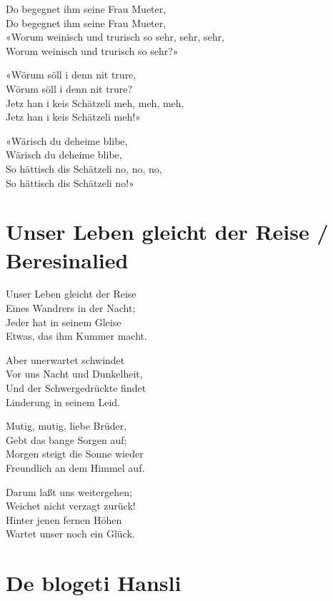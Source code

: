 \documentclass[
  letterpaper,
]{scrbook}
\begin{document}
Do begegnet ihm seine Frau Mueter,\\
Do begegnet ihm seine Frau Mueter,\\
«Worum weinisch und trurisch so sehr, sehr, sehr,\\
Worum weinisch und trurisch so sehr?»

«Wörum söll i denn nit trure,\\
Wörum söll i denn nit trure?\\
Jetz han i keis Schätzeli meh, meh, meh,\\
Jetz han i keis Schätzeli meh!»

«Wärisch du deheime blibe,\\
Wärisch du deheime blibe,\\
So hättisch dis Schätzeli no, no, no,\\
So hättisch dis Schätzeli no!»

\hypertarget{unser-leben-gleicht-der-reise-beresinalied}{%
\chapter{Unser Leben gleicht der Reise /
Beresinalied}\label{unser-leben-gleicht-der-reise-beresinalied}}

Unser Leben gleicht der Reise\\
Eines Wandrers in der Nacht;\\
Jeder hat in seinem Gleise\\
Etwas, das ihm Kummer macht.

Aber unerwartet schwindet\\
Vor uns Nacht und Dunkelheit,\\
Und der Schwergedrückte findet\\
Linderung in seinem Leid.

Mutig, mutig, liebe Brüder,\\
Gebt das bange Sorgen auf;\\
Morgen steigt die Sonne wieder\\
Freundlich an dem Himmel auf.

Darum laßt uns weitergehen;\\
Weichet nicht verzagt zurück!\\
Hinter jenen fernen Höhen\\
Wartet unser noch ein Glück.

\hypertarget{de-blogeti-hansli}{%
\chapter{De blogeti Hansli}\label{de-blogeti-hansli}}
\end{document}
